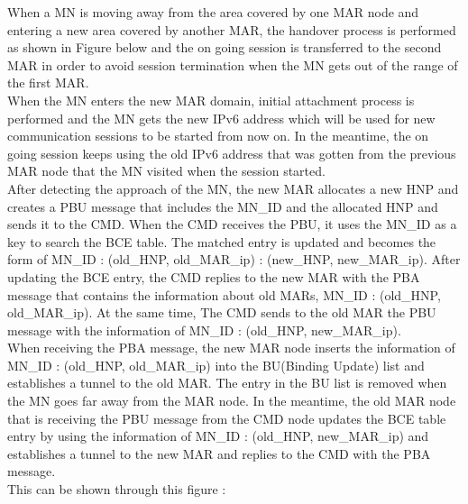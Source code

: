 \documentclass{article}
\begin{document}
When a MN is moving away from the area covered by one MAR node and
entering a new area covered by another MAR, the handover process is
performed as shown in Figure below and the on going session is
transferred to the second MAR in order to avoid session termination
when the MN gets out of the range of the first MAR.\\
\newline 
When the MN enters the new MAR domain, initial attachment process is
performed and the MN gets the new IPv6 address which will be used for
new communication sessions to be started from now on. In the meantime,
the on going session keeps using the old IPv6 address that was gotten
from the previous MAR node that the MN visited when the session
started.\\
\newline
After detecting the approach of the MN, the new MAR allocates a new
HNP and creates a PBU message that includes the MN\_ID and the
allocated HNP and sends it to the CMD. When the CMD receives the PBU,
it uses the MN\_ID as a key to search the BCE table. The matched entry
is updated and becomes the form of {MN\_ID : (old\_HNP, old\_MAR\_ip)
  : (new\_HNP, new\_MAR\_ip)}. After updating the BCE entry, the CMD
replies to the new MAR with the PBA message that contains the
information about old MARs, {MN\_ID : (old\_HNP, old\_MAR\_ip)}. At
the same time, The CMD sends to the old MAR the PBU message with the
information of {MN\_ID : (old\_HNP, new\_MAR\_ip)}.\\
\newline
When receiving the PBA message, the new MAR node inserts the
information of {MN\_ID : (old\_HNP, old\_MAR\_ip)} into the BU(Binding
Update) list and establishes a tunnel to the old MAR. The entry in the
BU list is removed when the MN goes far away from the MAR node. In the
meantime, the old MAR node that is receiving the PBU message from the
CMD node updates the BCE table entry by using the information of
{MN\_ID : (old\_HNP, new\_MAR\_ip)} and establishes a tunnel to the
new MAR and replies to the CMD with the PBA message. \\
\newline
This can be shown through this figure :
\end{document}
